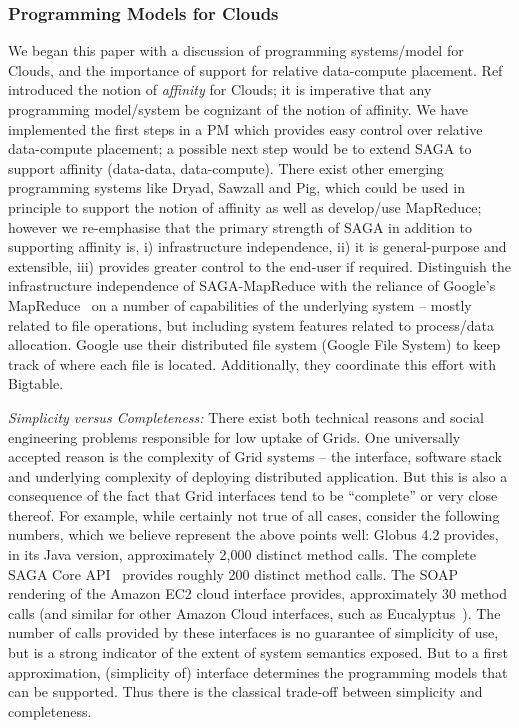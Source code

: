 \documentclass[conference,final]{IEEEtran}
\newcommand{\sagamapreduce }{SAGA-MapReduce }
\begin{document}
\subsubsection*{Programming Models for Clouds} We began this paper
with a discussion of programming systems/model for Clouds, and the
importance of support for relative data-compute
placement. Ref~\cite{jha_ccpe09} introduced the notion of {\it
  affinity} for Clouds; it is imperative that any programming
model/system be cognizant of the notion of affinity. We have
implemented the first steps in a PM which provides easy control over
relative data-compute placement; a possible next step would be to
extend SAGA to support affinity (data-data, data-compute).  There
exist other emerging programming systems like Dryad, Sawzall and Pig,
which could be used in principle to support the notion of affinity as
well as develop/use MapReduce; however we re-emphasise that the
primary strength of SAGA in addition to supporting affinity is, i)
infrastructure independence, ii) it is general-purpose and extensible, iii)
provides greater control to the end-user if required.  Distinguish the
infrastructure independence of \sagamapreduce with the reliance of
Google's MapReduce~\cite{mapreduce-paper} on a number of capabilities
of the underlying system -- mostly related to file operations, but
including system features related to process/data
allocation.  %
Google use their distributed file system (Google File System) to keep
track of where each file is located.  Additionally, they coordinate
this effort with Bigtable.


{\it Simplicity versus Completeness:} There exist both technical
reasons and social engineering problems responsible for low uptake of
Grids. One universally accepted reason is the complexity of Grid
systems -- the interface, software stack and underlying complexity of
deploying distributed application. But this is also a consequence of
the fact that Grid interfaces tend to be ``complete'' or very close
thereof.  For example, while certainly not true of all cases, consider
the following numbers, which we believe represent the above points
well: Globus 4.2 provides, in its Java version,
approximately 2,000 distinct method calls.  The complete SAGA Core
API~\cite{saga-core} provides roughly 200 distinct method calls.  The
SOAP rendering of the Amazon EC2 cloud interface provides,
approximately 30 method calls (and similar for other Amazon Cloud
interfaces, such as Eucalyptus~\cite{eucalyptus}).  The number of
calls provided by these interfaces is no guarantee of simplicity of
use, but is a strong indicator of the extent of system semantics
exposed.  But to a first approximation, (simplicity of) interface
determines the programming models that can be supported. Thus there is
the classical trade-off between simplicity and completeness.
\end{document}
